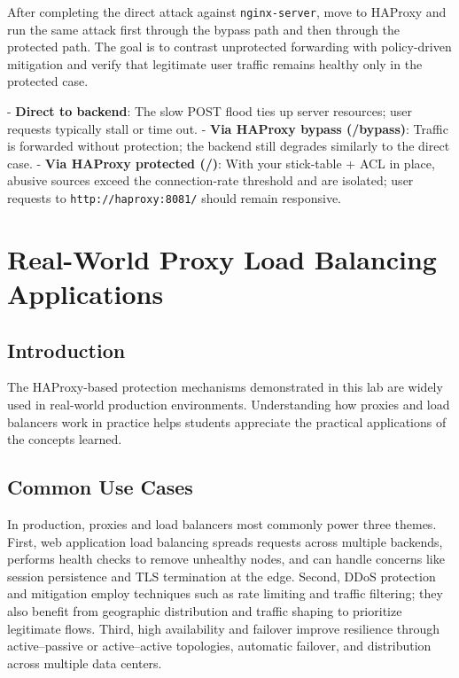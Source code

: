 \documentclass[12pt]{article}
\begin{document}
    After completing the direct attack against \texttt{nginx-server}, move to HAProxy and run the same attack first through the bypass path and then through the protected path. The goal is to contrast unprotected forwarding with policy-driven mitigation and verify that legitimate user traffic remains healthy only in the protected case.

    - \textbf{Direct to backend}: The slow POST flood ties up server resources; user requests typically stall or time out.
    - \textbf{Via HAProxy bypass (/bypass)}: Traffic is forwarded without protection; the backend still degrades similarly to the direct case.
    - \textbf{Via HAProxy protected (/)}: With your stick-table + ACL in place, abusive sources exceed the connection-rate threshold and are isolated; user requests to \texttt{http://haproxy:8081/} should remain responsive.

    \section{Real-World Proxy Load Balancing Applications}

    \subsection{Introduction}
    The HAProxy-based protection mechanisms demonstrated in this lab are widely used in real-world production environments. Understanding how proxies and load balancers work in practice helps students appreciate the practical applications of the concepts learned.

    \subsection{Common Use Cases}

    In production, proxies and load balancers most commonly power three themes. First, web application load balancing spreads requests across multiple backends, performs health checks to remove unhealthy nodes, and can handle concerns like session persistence and TLS termination at the edge. Second, DDoS protection and mitigation employ techniques such as rate limiting and traffic filtering; they also benefit from geographic distribution and traffic shaping to prioritize legitimate flows. Third, high availability and failover improve resilience through active–passive or active–active topologies, automatic failover, and distribution across multiple data centers.
\end{document}
